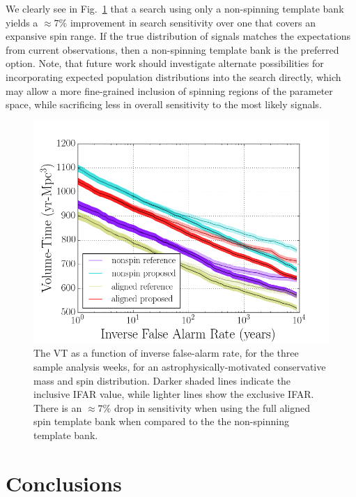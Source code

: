 We clearly see in Fig.~\ref{fig:rest} that a search using only a non-spinning template bank yields a $\approx{7\%}$ improvement in search sensitivity over one that covers an expansive spin range. If the true distribution of signals matches the expectations from current observations, then a non-spinning template bank is the preferred option. Note, that future work should investigate alternate possibilities for incorporating expected population distributions into the search directly, which may allow a more fine-grained inclusion of spinning regions of the parameter space, while sacrificing less in overall sensitivity to the most likely signals.

\begin{figure}
\centering
\includegraphics[width=1.0\textwidth]{papers/bns_o1_dev/figures/rest_combined.png}
\caption{\label{fig:rest} 
The VT as a function of inverse false-alarm rate, for the
three sample analysis weeks, for an astrophysically-motivated conservative mass and spin distribution. Darker shaded lines indicate the inclusive IFAR value, while lighter lines show the exclusive IFAR. There is an $\approx 7\%$ drop in sensitivity when using the full aligned spin template bank when compared to the the non-spinning
template bank.}
\end{figure}

\section{Conclusions}

